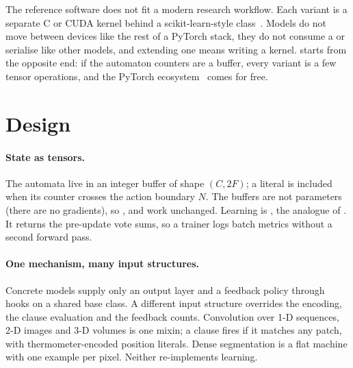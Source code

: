 \documentclass[10.5pt,a4paper]{article}
\begin{document}
The reference software does not fit a modern research workflow. Each variant is a separate C
or CUDA kernel behind a scikit-learn-style class~. Models do not move between devices
like the rest of a PyTorch stack, they do not consume a  or serialise like
other models, and extending one means writing a kernel. \ttlibname starts from the opposite
end: if the automaton counters are a  buffer, every variant is a few tensor
operations, and the PyTorch ecosystem~ comes for free.

\section{Design}

\paragraph{State as tensors.} The automata live in an integer buffer  of shape
$(C, 2F)$; a literal is included when its counter crosses the action boundary $N$. The buffers
are not parameters (there are no gradients), so ,  and
 work unchanged. Learning is , the analogue of
. It returns the pre-update vote sums, so a trainer
logs batch metrics without a second forward pass.

\paragraph{One mechanism, many input structures.} Concrete models supply only an output layer
and a feedback policy through hooks on a shared base class. A different input structure
overrides the encoding, the clause evaluation and the feedback counts. Convolution over 1-D
sequences, 2-D images and 3-D volumes is one mixin; a clause fires if it matches any patch,
with thermometer-encoded position literals. Dense segmentation is a flat machine with one
example per pixel. Neither re-implements learning.
\end{document}
